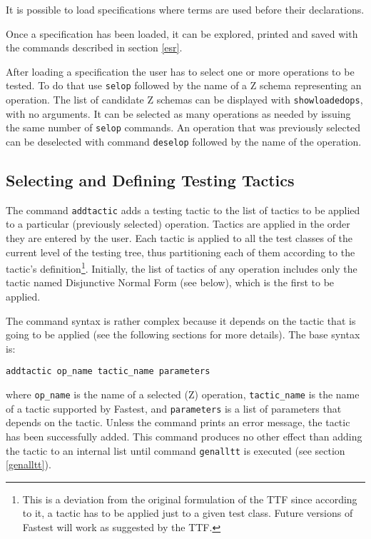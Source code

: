 It is possible to load specifications where terms are used before their declarations.

Once a specification has been loaded, it can be explored, printed and saved with the commands described in section \ref{esr}.

After loading a specification the user has to select one or more operations to be tested. To do that use \verb+selop+ followed by the name of a Z schema representing an operation. The list of candidate Z schemas can be displayed with \verb+showloadedops+, with no arguments. It can be selected as many operations as needed by issuing the same number of \verb+selop+ commands. An operation that was previously selected can be deselected with command \verb+deselop+ followed by the name of the operation.


\subsection{\label{tactics}Selecting and Defining Testing Tactics}

The command \verb+addtactic+ adds a testing tactic to the list of tactics to be applied to a particular (previously selected) operation. Tactics are applied in the order they are entered by the user. Each tactic is applied to all the test classes of the current level of the testing tree, thus partitioning each of them according to the tactic's definition\footnote{This is a deviation from the original formulation of the TTF since according to it, a tactic has to be applied just to a given test class. Future versions of Fastest will work as suggested by the TTF.}. Initially, the list of tactics of any operation includes only the tactic named Disjunctive Normal Form (see below), which is the first to be applied.

The command syntax is rather complex because it depends on the tactic that is going to be applied (see the following sections for more details). The base syntax is: 

\begin{verbatim}
addtactic op_name tactic_name parameters
\end{verbatim}

\noindent where \verb+op_name+ is the name of a selected (Z) operation, \verb+tactic_name+ is the name of a tactic supported by Fastest, and \verb+parameters+ is a list of parameters that depends on the tactic. Unless the command prints an error message, the tactic has been successfully added. This command produces no other effect than adding the tactic to an internal list until command \verb+genalltt+ is executed (see section \ref{genalltt}).

